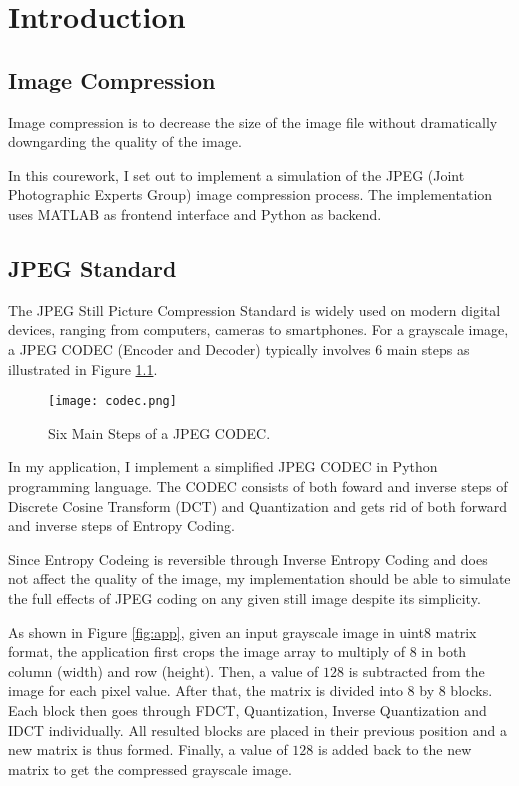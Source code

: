 \chapter{Introduction}
\label{chap:introduction}

\section{Image Compression}

Image compression is to decrease the size of the image file without dramatically downgarding the quality of the image.

In this courework, I set out to implement a simulation of the JPEG (Joint Photographic Experts Group) image compression process\citep{wallace1992jpeg}. The implementation uses MATLAB as frontend interface and Python as backend.

\section{JPEG Standard}

The JPEG Still Picture Compression Standard is widely used on modern digital devices, ranging from computers, cameras to smartphones. For a grayscale image, a JPEG CODEC (Encoder and Decoder) typically involves 6 main steps as illustrated in Figure \ref{fig:codec}.

\begin{figure}
\centering
\texttt{[image: codec.png]}
\caption{Six Main Steps of a JPEG CODEC.}
\label{fig:codec}
\end{figure}

In my application, I implement a simplified JPEG CODEC in Python programming language. The CODEC consists of both foward and inverse steps of Discrete Cosine Transform (DCT) and Quantization and gets rid of both forward and inverse steps of Entropy Coding. 

Since Entropy Codeing is reversible through Inverse Entropy Coding and does not affect the quality of the image, my implementation should be able to simulate the full effects of JPEG coding on any given still image despite its simplicity.

As shown in Figure \ref{fig:app}, given an input grayscale image in uint8 matrix format, the application first crops the image array to multiply of $8$ in both column (width) and row (height). Then, a value of $128$ is subtracted from the image for each pixel value. After that, the matrix is divided into 8 by 8 blocks. Each block then goes through FDCT, Quantization, Inverse Quantization and IDCT individually.  All resulted blocks are placed in their previous position and a new matrix is thus formed. Finally, a value of $128$ is added back to the new matrix to get the compressed grayscale image. 

